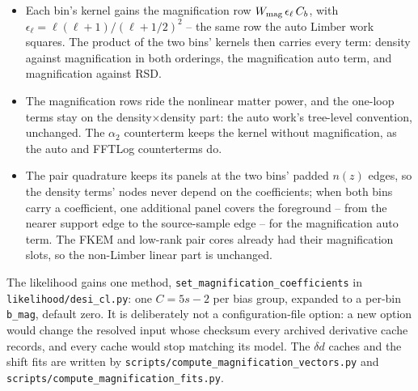 \documentclass[11pt]{article}
\newcommand{\us}{\_\allowbreak}
\begin{document}
\begin{itemize}
\item Each bin's kernel gains the magnification row
  $W_{\rm mag}\,\epsilon_\ell\,C_b$, with
  $\epsilon_\ell = \ell(\ell+1)/(\ell+1/2)^2$ -- the same row the
  auto Limber work squares.  The product of the two bins' kernels
  then carries every term: density against magnification in both
  orderings, the magnification auto term, and magnification against
  RSD.
\item The magnification rows ride the nonlinear matter power, and
  the one-loop terms stay on the density$\times$density part: the
  auto work's tree-level convention, unchanged.  The $\alpha_2$
  counterterm keeps the kernel without magnification, as the auto
  and FFTLog counterterms do.
\item The pair quadrature keeps its panels at the two bins' padded
  $n(z)$ edges, so the density terms' nodes never depend on the
  coefficients; when both bins carry a coefficient, one additional
  panel covers the foreground -- from the nearer support edge to
  the source-sample edge -- for the magnification auto term.  The
  FKEM and low-rank pair cores already had their magnification
  slots, so the non-Limber linear part is unchanged.
\end{itemize}

The likelihood gains one method,
\texttt{set\us magnification\us coefficients} in
\texttt{likelihood/desi\us cl.py}: one $C = 5s - 2$ per bias group,
expanded to a per-bin \texttt{b\us mag}, default zero.  It is
deliberately not a configuration-file option: a new option would
change the resolved input whose checksum every archived derivative
cache records, and every cache would stop matching its model.  The
$\delta d$ caches and the shift fits are written by
\texttt{scripts/compute\us magnification\us vectors.py} and
\texttt{scripts/compute\us magnification\us fits.py}.
\end{document}
